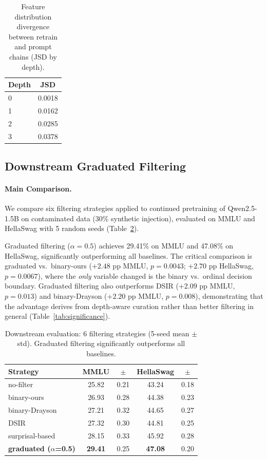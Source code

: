 \documentclass[11pt,a4paper]{article}
\begin{document}
\begin{table}[t]
\centering
\small
\caption{Feature distribution divergence between retrain and prompt chains (JSD by depth).}
\label{tab:retrain_jsd}
\begin{tabular}{lc}
\toprule
\textbf{Depth} & \textbf{JSD} \\
\midrule
0 & 0.0018 \\
1 & 0.0162 \\
2 & 0.0285 \\
3 & 0.0378 \\
\bottomrule
\end{tabular}
\end{table}

\subsection{Downstream Graduated Filtering}
\label{sec:filtering}

\paragraph{Main Comparison.}
We compare six filtering strategies applied to continued pretraining of Qwen2.5-1.5B on contaminated data (30\% synthetic injection), evaluated on MMLU and HellaSwag with 5 random seeds (Table~\ref{tab:downstream}).

Graduated filtering ($\alpha=0.5$) achieves 29.41\% on MMLU and 47.08\% on HellaSwag, significantly outperforming all baselines.
The critical comparison is graduated vs.\ binary-ours ($+2.48$ pp MMLU, $p=0.0043$; $+2.70$ pp HellaSwag, $p=0.0067$), where the \emph{only} variable changed is the binary vs.\ ordinal decision boundary.
Graduated filtering also outperforms DSIR ($+2.09$ pp MMLU, $p=0.013$) and binary-Drayson ($+2.20$ pp MMLU, $p=0.008$), demonstrating that the advantage derives from depth-aware curation rather than better filtering in general (Table~\ref{tab:significance}).

\begin{table}[t]
\centering
\small
\caption{Downstream evaluation: 6 filtering strategies (5-seed mean $\pm$ std). Graduated filtering significantly outperforms all baselines.}
\label{tab:downstream}
\begin{tabular}{lcccc}
\toprule
\textbf{Strategy} & \textbf{MMLU} & \textbf{$\pm$} & \textbf{HellaSwag} & \textbf{$\pm$} \\
\midrule
no-filter & 25.82 & 0.21 & 43.24 & 0.18 \\
binary-ours & 26.93 & 0.28 & 44.38 & 0.23 \\
binary-Drayson & 27.21 & 0.32 & 44.65 & 0.27 \\
DSIR & 27.32 & 0.30 & 44.81 & 0.25 \\
surprisal-based & 28.15 & 0.33 & 45.92 & 0.28 \\
\textbf{graduated ($\alpha$=0.5)} & \textbf{29.41} & 0.25 & \textbf{47.08} & 0.20 \\
\bottomrule
\end{tabular}
\end{table}
\end{document}
